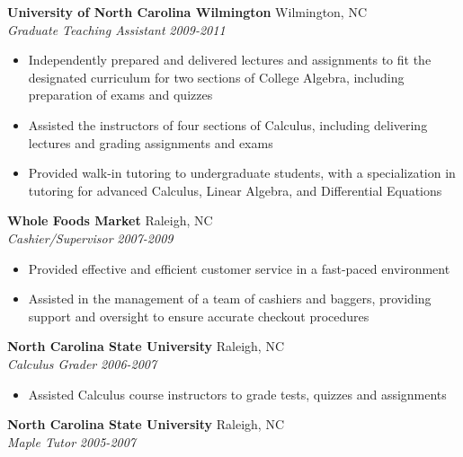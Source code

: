 \documentclass[10pt]{article}
\begin{document}
\noindent
{\bf University of North Carolina Wilmington} \hfill Wilmington, NC\\
{\it Graduate Teaching Assistant} \hfill {\it 2009-2011}

\begin{itemize}

\item Independently prepared and delivered lectures and assignments to fit
the designated curriculum for two sections of College Algebra, including
preparation of exams and quizzes

\item Assisted the instructors of four sections of Calculus, including
delivering lectures and grading assignments and exams

\item	Provided walk-in tutoring to undergraduate students, with a
specialization in tutoring for advanced Calculus, Linear Algebra,
and Differential Equations

\end{itemize}


\noindent
{\bf Whole Foods Market} \hfill Raleigh, NC\\
{\it Cashier/Supervisor} \hfill {\it 2007-2009}

\begin{itemize}

\item Provided effective and efficient customer service in a fast-paced
environment

\item Assisted in the management of a team of cashiers and baggers, providing
support and oversight to ensure accurate checkout procedures

\end{itemize}


\noindent
{\bf North Carolina State University} \hfill Raleigh, NC\\
{\it Calculus Grader} \hfill {\it 2006-2007}

\begin{itemize}

\item Assisted Calculus course instructors to grade tests, quizzes and
assignments

\end{itemize}


\noindent
{\bf North Carolina State University} \hfill Raleigh, NC\\
{\it Maple Tutor} \hfill {\it 2005-2007}
\end{document}
